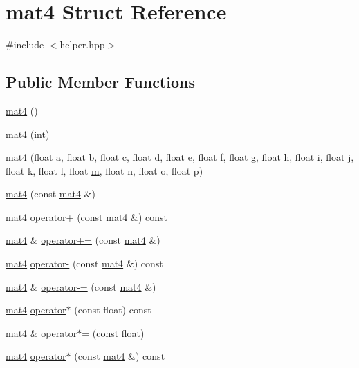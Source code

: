 \hypertarget{structmat4}{\section{mat4 Struct Reference}
\label{structmat4}
}


{\ttfamily \#include $<$helper.\+hpp$>$}

\subsection*{Public Member Functions}
\begin{DoxyCompactItemize}
\item 
\hyperlink{structmat4_acf3f0c37ff5c16e8fb1bfdde2bf87a0f}{mat4} ()
\item 
\hyperlink{structmat4_abbb345d8e90b7f5520a2854e4d171fad}{mat4} (int)
\item 
\hyperlink{structmat4_a9064945e550426ca0cbdc783abc159e3}{mat4} (float a, float b, float c, float d, float e, float f, float g, float h, float i, float j, float k, float l, float \hyperlink{structmat4_ab424bc8677a83f16bd30f4eaaecb6d3a}{m}, float n, float o, float p)
\item 
\hyperlink{structmat4_a073e199b47525502781e3c36ef032dfb}{mat4} (const \hyperlink{structmat4}{mat4} \&)
\item 
\hyperlink{structmat4}{mat4} \hyperlink{structmat4_a1e09ab23f48d22eacf7480be5a6cea87}{operator+} (const \hyperlink{structmat4}{mat4} \&) const 
\item 
\hyperlink{structmat4}{mat4} \& \hyperlink{structmat4_a350e999ece6a2de198453342051887d5}{operator+=} (const \hyperlink{structmat4}{mat4} \&)
\item 
\hyperlink{structmat4}{mat4} \hyperlink{structmat4_a2ad7a60d812142642531b0ac06bf1c8e}{operator-\/} (const \hyperlink{structmat4}{mat4} \&) const 
\item 
\hyperlink{structmat4}{mat4} \& \hyperlink{structmat4_ac132dfe2e95f489dbd7164d91b535d7b}{operator-\/=} (const \hyperlink{structmat4}{mat4} \&)
\item 
\hyperlink{structmat4}{mat4} \hyperlink{structmat4_adfe86534dfda83be41334feaff6a9584}{operator$\ast$} (const float) const 
\item 
\hyperlink{structmat4}{mat4} \& \hyperlink{structmat4_ad0826521db3c90c1b3aba01c0e36d26e}{operator$\ast$=} (const float)
\item 
\hyperlink{structmat4}{mat4} \hyperlink{structmat4_a7cabd070852d9ccb840b20a6e4e492c2}{operator$\ast$} (const \hyperlink{structmat4}{mat4} \&) const 

\end{DoxyCompactItemize}
